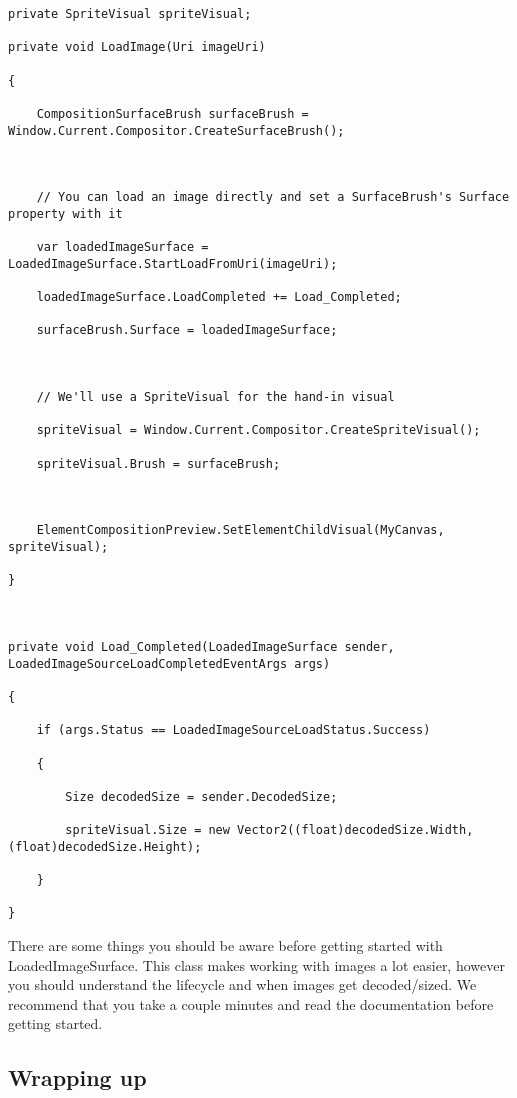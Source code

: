 \begin{lstlisting}[style=CSharpStyle]
private SpriteVisual spriteVisual;

private void LoadImage(Uri imageUri)

{
	
	CompositionSurfaceBrush surfaceBrush = Window.Current.Compositor.CreateSurfaceBrush();
	
	
	
	// You can load an image directly and set a SurfaceBrush's Surface property with it
	
	var loadedImageSurface = LoadedImageSurface.StartLoadFromUri(imageUri);
	
	loadedImageSurface.LoadCompleted += Load_Completed;
	
	surfaceBrush.Surface = loadedImageSurface;
	
	
	
	// We'll use a SpriteVisual for the hand-in visual
	
	spriteVisual = Window.Current.Compositor.CreateSpriteVisual();
	
	spriteVisual.Brush = surfaceBrush;
	
	
	
	ElementCompositionPreview.SetElementChildVisual(MyCanvas, spriteVisual);
	
}



private void Load_Completed(LoadedImageSurface sender, LoadedImageSourceLoadCompletedEventArgs args)

{
	
	if (args.Status == LoadedImageSourceLoadStatus.Success)
	
	{
		
		Size decodedSize = sender.DecodedSize;
		
		spriteVisual.Size = new Vector2((float)decodedSize.Width, (float)decodedSize.Height);
		
	}
	
}
\end{lstlisting}

There are some things you should be aware before getting started with LoadedImageSurface. This class makes working with images a lot easier, however you should understand the lifecycle and when images get decoded/sized. We recommend that you take a couple minutes and read the documentation before getting started.

\subsection{Wrapping up}

